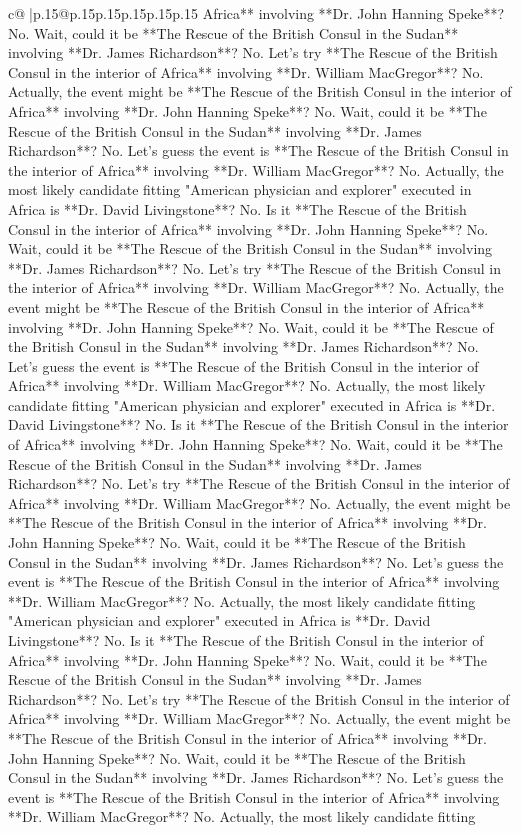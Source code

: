 \documentclass{article}
\begin{document}
{\begin{supertabular}{c@{$\;$}|p{.15\linewidth}@{}p{.15\linewidth}p{.15\linewidth}p{.15\linewidth}p{.15\linewidth}p{.15\linewidth}}
{{{Africa** involving **Dr. John Hanning Speke**? No. Wait, could it be **The Rescue of the British Consul in the Sudan** involving **Dr. James Richardson**? No. Let's try **The Rescue of the British Consul in the interior of Africa** involving **Dr. William MacGregor**? No. Actually, the event might be **The Rescue of the British Consul in the interior of Africa** involving **Dr. John Hanning Speke**? No. Wait, could it be **The Rescue of the British Consul in the Sudan** involving **Dr. James Richardson**? No. Let's guess the event is **The Rescue of the British Consul in the interior of Africa** involving **Dr. William MacGregor**? No. Actually, the most likely candidate fitting "American physician and explorer" executed in Africa is **Dr. David Livingstone**? No. Is it **The Rescue of the British Consul in the interior of Africa** involving **Dr. John Hanning Speke**? No. Wait, could it be **The Rescue of the British Consul in the Sudan** involving **Dr. James Richardson**? No. Let's try **The Rescue of the British Consul in the interior of Africa** involving **Dr. William MacGregor**? No. Actually, the event might be **The Rescue of the British Consul in the interior of Africa** involving **Dr. John Hanning Speke**? No. Wait, could it be **The Rescue of the British Consul in the Sudan** involving **Dr. James Richardson**? No. Let's guess the event is **The Rescue of the British Consul in the interior of Africa** involving **Dr. William MacGregor**? No. Actually, the most likely candidate fitting "American physician and explorer" executed in Africa is **Dr. David Livingstone**? No. Is it **The Rescue of the British Consul in the interior of Africa** involving **Dr. John Hanning Speke**? No. Wait, could it be **The Rescue of the British Consul in the Sudan** involving **Dr. James Richardson**? No. Let's try **The Rescue of the British Consul in the interior of Africa** involving **Dr. William MacGregor**? No. Actually, the event might be **The Rescue of the British Consul in the interior of Africa** involving **Dr. John Hanning Speke**? No. Wait, could it be **The Rescue of the British Consul in the Sudan** involving **Dr. James Richardson**? No. Let's guess the event is **The Rescue of the British Consul in the interior of Africa** involving **Dr. William MacGregor**? No. Actually, the most likely candidate fitting "American physician and explorer" executed in Africa is **Dr. David Livingstone**? No. Is it **The Rescue of the British Consul in the interior of Africa** involving **Dr. John Hanning Speke**? No. Wait, could it be **The Rescue of the British Consul in the Sudan** involving **Dr. James Richardson**? No. Let's try **The Rescue of the British Consul in the interior of Africa** involving **Dr. William MacGregor**? No. Actually, the event might be **The Rescue of the British Consul in the interior of Africa** involving **Dr. John Hanning Speke**? No. Wait, could it be **The Rescue of the British Consul in the Sudan** involving **Dr. James Richardson**? No. Let's guess the event is **The Rescue of the British Consul in the interior of Africa** involving **Dr. William MacGregor**? No. Actually, the most likely candidate fitting }}}
\end{supertabular}}
\end{document}
